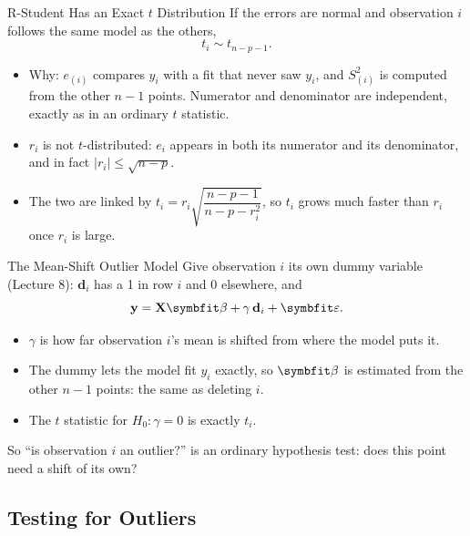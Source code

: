 \begin{frame}{R-Student Has an Exact $t$ Distribution}
    If the errors are normal and observation $i$ follows the same model as the others,
    \[
    t_i\sim t_{n-p-1}.
    \]
    \begin{itemize}
        \item Why: $e_{(i)}$ compares $y_i$ with a fit that never saw $y_i$, and $S_{(i)}^2$ is computed from the other $n-1$ points. Numerator and denominator are independent, exactly as in an ordinary $t$ statistic.
        \item $r_i$ is not $t$-distributed: $e_i$ appears in both its numerator and its denominator, and in fact $|r_i|\le\sqrt{n-p}$.
        \item The two are linked by $t_i=r_i\sqrt{\dfrac{n-p-1}{n-p-r_i^2}}$, so $t_i$ grows much faster than $r_i$ once $r_i$ is large.
    \end{itemize}
\end{frame}


\begin{frame}{The Mean-Shift Outlier Model}
    Give observation $i$ its own dummy variable (Lecture 8): $\mathbf{d}_i$ has a 1 in row $i$ and 0 elsewhere, and
    \[
    \by=\bX\bbeta+\gamma\,\mathbf{d}_i+\bvarepsilon .
    \]
    \begin{itemize}
        \item $\gamma$ is how far observation $i$'s mean is shifted from where the model puts it.
        \item The dummy lets the model fit $y_i$ exactly, so $\bbeta$ is estimated from the other $n-1$ points: the same as deleting $i$.
        \item The $t$ statistic for $H_0:\gamma=0$ is exactly $t_i$.
    \end{itemize}
    \svspace{0.3em}
    So ``is observation $i$ an outlier?'' is an ordinary hypothesis test: does this point need a shift of its own?
\end{frame}


\subsection{Testing for Outliers}


